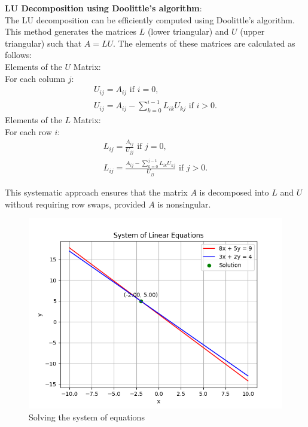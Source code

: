\documentclass[journal]{IEEEtran}
\begin{document}
\textbf{LU Decomposition using Doolittle's algorithm}:  \\
The LU decomposition can be efficiently computed using Doolittle's algorithm. This method generates the matrices $L$ (lower triangular) and $U$ (upper triangular) such that $A = LU$. The elements of these matrices are calculated as follows: \\  
Elements of the $U$ Matrix: \\  
For each column $j$:  
\begin{align}  
U_{ij} = A_{ij} \text{ if } i = 0, \\  
U_{ij} = A_{ij} - \sum_{k=0}^{i-1} L_{ik} U_{kj} \text{ if } i > 0.  
\end{align}  
Elements of the $L$ Matrix: \\  
For each row $i$:  
\begin{align}  
L_{ij} = \frac{A_{ij}}{U_{jj}} \text{ if } j = 0, \\  
L_{ij} = \frac{A_{ij} - \sum_{k=0}^{j-1} L_{ik} U_{kj}}{U_{jj}} \text{ if } j > 0.  
\end{align}  

This systematic approach ensures that the matrix $A$ is decomposed into $L$ and $U$ without requiring row swaps, provided $A$ is nonsingular.  
\begin{figure}[h!]
   \centering
   \includegraphics[width=1\columnwidth]{figure/fig.png}
   \caption{Solving the system of equations}
   \label{stemplot}
\end{figure}
\end{document}
